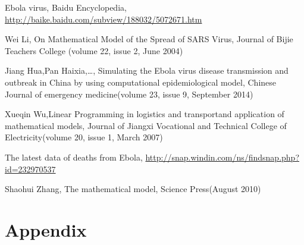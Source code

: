 \documentclass{icmmcm}
\begin{document}

\begin{thebibliography}{10}
Ebola virus, Baidu Encyclopedia,
  \url{http://baike.baidu.com/subview/188032/5072671.htm}

Wei Li, On Mathematical Model of the Spread of
  SARS Virus, Journal of Bijie Teachers College (volume 22,
  issue 2, June 2004)

Jiang Hua,Pan Haixia,\ldots, Simulating the Ebola
virus disease transmission and outbreak in China by using computational
epidemiological model, Chinese Journal of emergency
medicine(volume 23, issue 9, September 2014)

Xueqin Wu,Linear Programming in logistics and
transportand application of mathematical models, Journal of
Jiangxi Vocational and Technical College of Electricity(volume
20, issue 1, March 2007)

The latest data of deaths from Ebola,
\url{http://snap.windin.com/ns/findsnap.php?id=232970537}

Shaohui Zhang, The mathematical model, Science
Press(August 2010)
\end{thebibliography}

\section*{Appendix}

\end{document}
